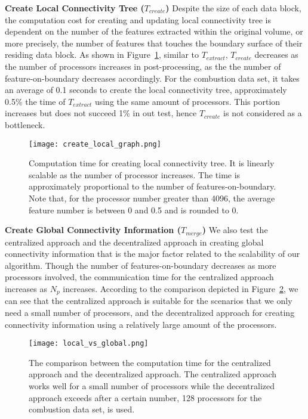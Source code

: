 \textbf{Create Local Connectivity Tree ($T_{create}$)}
%
Despite the size of each data block, the computation cost for creating and updating local connectivity tree is dependent on the number of the features extracted within the original volume, or more precisely, the number of features that touches the boundary surface of their residing data block. As shown in Figure~\ref{fig:create-local-graph}, similar to $T_{extract}$, $T_{create}$ decreases as the number of processors increases in post-processing, as the the number of feature-on-boundary decreases accordingly. For the combustion data set, it takes an average of 0.1 seconds to create the local connectivity tree, approximately 0.5\% the time of $T_{extract}$ using the same amount of processors. This portion increases but does not succeed 1\% in out test, hence $T_{create}$ is not considered as a bottleneck. %

\begin{figure}[t]
\centering
\texttt{[image: create\_local\_graph.png]}
\caption{Computation time for creating local connectivity tree. It is linearly scalable as the number of processor increases. The time is approximately proportional to the number of features-on-boundary. Note that, for the processor number greater than 4096, the average feature number is between 0 and 0.5 and is rounded to 0.}
\label{fig:create-local-graph}
\end{figure}

\textbf{Create Global Connectivity Information ($T_{merge}$)}
%
We also test the centralized approach and the decentralized approach in creating global connectivity information that is the major factor related to the scalability of our algorithm. Though the number of features-on-boundary decreases as more processors involved, the communication time for the centralized approach increases as $N_p$ increases. According to the comparison depicted in Figure~\ref{fig:local-vs-global}, we can see that the centralized approach is suitable for the scenarios that we only need a small number of processors, and the decentralized approach for creating connectivity information using a relatively large amount of the processors.

\begin{figure}[ht]
\centering
\texttt{[image: local\_vs\_global.png]}
\caption{The comparison between the computation time for the centralized approach and the decentralized approach. The centralized approach works well for a small number of processors while the decentralized approach exceeds after a certain number, 128 processors for the combustion data set, is used.}
\label{fig:local-vs-global}
\end{figure}

